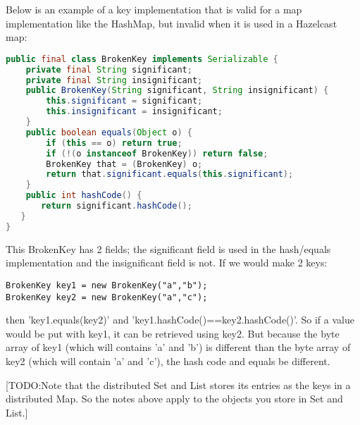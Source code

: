 Below is an example of a key implementation that is valid for a map implementation like the HashMap, but invalid when it is used in a Hazelcast map:
\begin{lstlisting}[language=java]
public final class BrokenKey implements Serializable {
    private final String significant;
    private final String insignificant;
    public BrokenKey(String significant, String insignificant) {
        this.significant = significant;
        this.insignificant = insignificant;
    }
    public boolean equals(Object o) {
        if (this == o) return true;
        if (!(o instanceof BrokenKey)) return false;
        BrokenKey that = (BrokenKey) o;
        return that.significant.equals(this.significant);
    }
    public int hashCode() {
       return significant.hashCode();
   }
}
\end{lstlisting}
This BrokenKey has 2 fields; the significant field is used in the hash/equals implementation and the insignificant field is not. If we would make 2 keys:
\begin{lstlisting}
BrokenKey key1 = new BrokenKey("a","b");
BrokenKey key2 = new BrokenKey("a","c");
\end{lstlisting} 
then 'key1.equals(key2)' and 'key1.hashCode()==key2.hashCode()'. So if a value would be put with key1, it can be retrieved using key2. But because the byte array of key1 (which will contains 'a' and 'b') is different than the byte array of key2 (which will contain 'a' and 'c'), the hash code and equals be different. 

[TODO:Note that the distributed Set and List stores its entries as the keys in a distributed Map. So the notes above apply to the objects you store in Set and List.]

